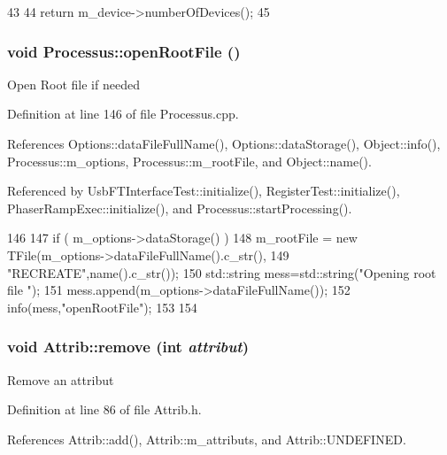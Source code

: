 \begin{DoxyCode}
43                                 {
44     return m_device->numberOfDevices();
45   }
\end{DoxyCode}
\hypertarget{classProcessus_aacf6812880c1d1a2bf14a4a39458f443}{
\subsubsection[{openRootFile}]{\setlength{\rightskip}{0pt plus 5cm}void Processus::openRootFile ()}}
\label{classProcessus_aacf6812880c1d1a2bf14a4a39458f443}
Open Root file if needed 

Definition at line 146 of file Processus.cpp.

References Options::dataFileFullName(), Options::dataStorage(), Object::info(), Processus::m\_\-options, Processus::m\_\-rootFile, and Object::name().

Referenced by UsbFTInterfaceTest::initialize(), RegisterTest::initialize(), PhaserRampExec::initialize(), and Processus::startProcessing().


\begin{DoxyCode}
146                                {
147   if ( m_options->dataStorage() ){
148     m_rootFile = new TFile(m_options->dataFileFullName().c_str(),
149                            "RECREATE",name().c_str());
150         std::string mess=std::string("Opening root file ");
151         mess.append(m_options->dataFileFullName());
152         info(mess,"openRootFile");
153   }
154 }
\end{DoxyCode}
\hypertarget{classAttrib_a7d4ef7e32d93cb287792b87b857e79f3}{
\subsubsection[{remove}]{\setlength{\rightskip}{0pt plus 5cm}void Attrib::remove (int {\em attribut})}}
\label{classAttrib_a7d4ef7e32d93cb287792b87b857e79f3}
Remove an attribut 

Definition at line 86 of file Attrib.h.

References Attrib::add(), Attrib::m\_\-attributs, and Attrib::UNDEFINED.

